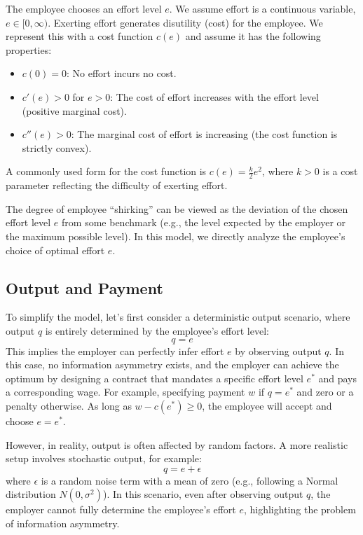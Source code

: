 The employee chooses an effort level $e$. We assume effort is a continuous variable, $e \in [0, \infty)$. Exerting effort generates disutility (cost) for the employee. We represent this with a cost function $c(e)$ and assume it has the following properties:
\begin{itemize}
    \item $c(0) = 0$: No effort incurs no cost.
    \item $c'(e) > 0$ for $e > 0$: The cost of effort increases with the effort level (positive marginal cost).
    \item $c''(e) > 0$: The marginal cost of effort is increasing (the cost function is strictly convex).
\end{itemize}
A commonly used form for the cost function is $c(e) = \frac{k}{2}e^2$, where $k > 0$ is a cost parameter reflecting the difficulty of exerting effort.

The degree of employee \enquote{shirking} can be viewed as the deviation of the chosen effort level $e$ from some benchmark (e.g., the level expected by the employer or the maximum possible level). In this model, we directly analyze the employee's choice of optimal effort $e$.

\subsection{Output and Payment}

To simplify the model, let's first consider a deterministic output scenario, where output $q$ is entirely determined by the employee's effort level:
\begin{equation}
q = e
\end{equation}
This implies the employer can perfectly infer effort $e$ by observing output $q$. In this case, no information asymmetry exists, and the employer can achieve the optimum by designing a contract that mandates a specific effort level $e^*$ and pays a corresponding wage. For example, specifying payment $w$ if $q=e^*$ and zero or a penalty otherwise. As long as $w - c(e^*) \ge 0$, the employee will accept and choose $e=e^*$.

However, in reality, output is often affected by random factors. A more realistic setup involves stochastic output, for example:
\begin{equation}
q = e + \epsilon
\end{equation}
where $\epsilon$ is a random noise term with a mean of zero (e.g., following a Normal distribution $N(0, \sigma^2)$). In this scenario, even after observing output $q$, the employer cannot fully determine the employee's effort $e$, highlighting the problem of information asymmetry.

